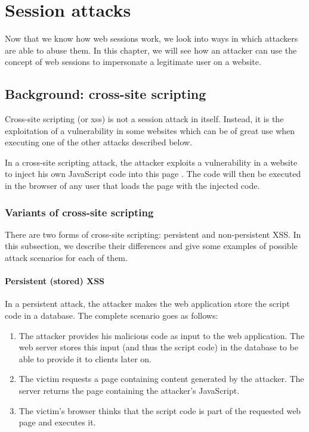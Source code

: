 \chapter{Session attacks}\label{attacks}

Now that we know how web sessions work, we look into ways in which attackers are able to abuse them. In this chapter, we will see how an attacker can use the concept of web sessions to impersonate a legitimate user on a website.

\section{Background: cross-site scripting}\label{xss}

Cross-site scripting (or \gls{xss}) is not a session attack in itself. Instead, it is the exploitation of a vulnerability in some websites which can be of great use when executing one of the other attacks described below.

In a cross-site scripting attack, the attacker exploits a vulnerability in a website to inject his own JavaScript code into this page \cite{DiLucca2005}. The code will then be executed in the browser of any user that loads the page with the injected code.

\subsection{Variants of cross-site scripting}
There are two forms of cross-site scripting: persistent and non-persistent XSS. In this subsection, we describe their differences and give some examples of possible attack scenarios for each of them.

\subsubsection{Persistent (stored) XSS}
In a persistent attack, the attacker makes the web application store the script code in a database. The complete scenario goes as follows:

\begin{enumerate}
	\item The attacker provides his malicious code as input to the web application.  The web server stores this input (and thus the script code) in the database to be able to provide it to clients later on.
	\item The victim requests a page containing content generated by the attacker. The server returns the page containing the attacker's JavaScript.
	\item The victim's browser thinks that the script code is part of the requested web page and executes it.
\end{enumerate}

